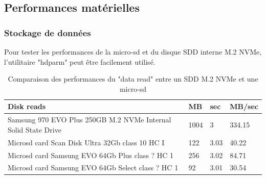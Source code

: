 ﻿\subsection{Performances matérielles}
\subsubsection{Stockage de données}
\par Pour tester les performances de la micro-sd et du disque SDD interne M.2 NVMe, l'utilitaire "hdparm" peut être facilement utilisé. 
{
   \vspace{0.3em} %
   \renewcommand*{\arraystretch}{1.4}
   \begin{longtable}[t]{@{}|p{25em}|p{2em}|p{2em}|p{3em}|@{}} 
      \caption{Comparaison des performances du "data read" entre un SDD M.2 NVMe et une micro-sd}\label{tab:Timing O_DIRECT disk reads}\\
      \hline
      \textbf{Disk reads} & \textbf{MB} & \textbf{sec} & \textbf{MB/sec}\\
      \hline
      Samsung 970 EVO Plus 250GB M.2 NVMe Internal Solid State Drive & 1004 & 3 & 334.15\\
      \hline
      Microsd card Scan Disk Ultra 32Gb class 10 HC I & 122 & 3.03 & 40.22\\
      \hline
      Microsd card Samsung EVO 64Gb Plus class ? HC 1 & 256 & 3.02 & 84.71\\
      \hline
      Microsd card Samsung EVO 64Gb Select class ? HC 1 & 92 & 3.01 & 30.54\\
      \hline
   \end{longtable}
}
